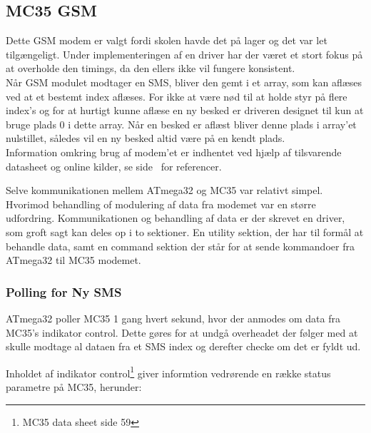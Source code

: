\subsection{MC35 GSM}

Dette GSM modem er valgt fordi skolen havde det på lager og det var let tilgængeligt.
Under implementeringen af en driver har der været et stort fokus på at overholde den timings, da den ellers ikke vil fungere konsistent.\\

Når GSM modulet modtager en SMS, bliver den gemt i et array, som kan aflæses ved at et bestemt index aflæses. For ikke at være nød til at holde styr 
på flere index's og for at hurtigt kunne aflæse en ny besked er driveren designet til kun at bruge plads 0 i dette array. 
Når en besked er aflæst bliver denne plads i array'et nulstillet, således vil en ny besked altid være på en kendt plads.\\

Information omkring brug af modem'et er indhentet ved hjælp af tilsvarende datasheet og online kilder, se side~\pageref{sec:refs} for referencer.

Selve kommunikationen mellem ATmega32 og MC35 var relativt simpel. Hvorimod behandling of modulering af data fra modemet var en større udfordring.
Kommunikationen og behandling af data er der skrevet en driver, som groft sagt kan deles op i to sektioner. En utility sektion, der har til formål at 
behandle data, samt en command sektion der står for at sende kommandoer fra ATmega32 til MC35 modemet. 

\subsubsection{Polling for Ny SMS}

ATmega32 poller MC35 1 gang hvert sekund, hvor der anmodes om data fra MC35's indikator control. 
Dette gøres for at undgå overheadet der følger med at skulle modtage al dataen fra et SMS index og derefter checke om det er fyldt ud.

Inholdet af indikator control\footnote{MC35 data sheet side 59} giver informtion vedrørende en række status parametre på MC35, herunder:

